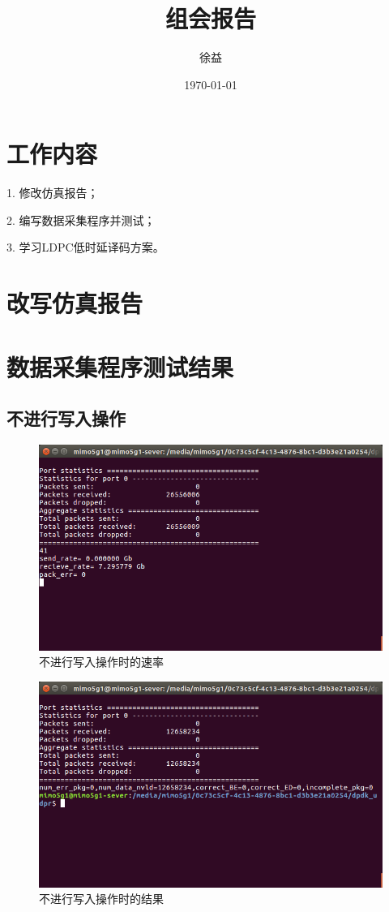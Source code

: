 \documentclass{article}
\title{组会报告}
\author{徐益}
\date{\today}
\begin{document}
\maketitle


\section{工作内容}
1. 修改仿真报告；

2. 编写数据采集程序并测试；

3. 学习LDPC低时延译码方案。

\section{改写仿真报告}

\section{数据采集程序测试结果}
\subsection{不进行写入操作}
\begin{figure}[H]
	\centering
	\includegraphics[width = .8\textwidth]{rate1.png}
	\caption{不进行写入操作时的速率}
\end{figure}
\begin{figure}[H]
	\centering
	\includegraphics[width = .8\textwidth]{res1.png}
	\caption{不进行写入操作时的结果}
\end{figure}
\end{document}
